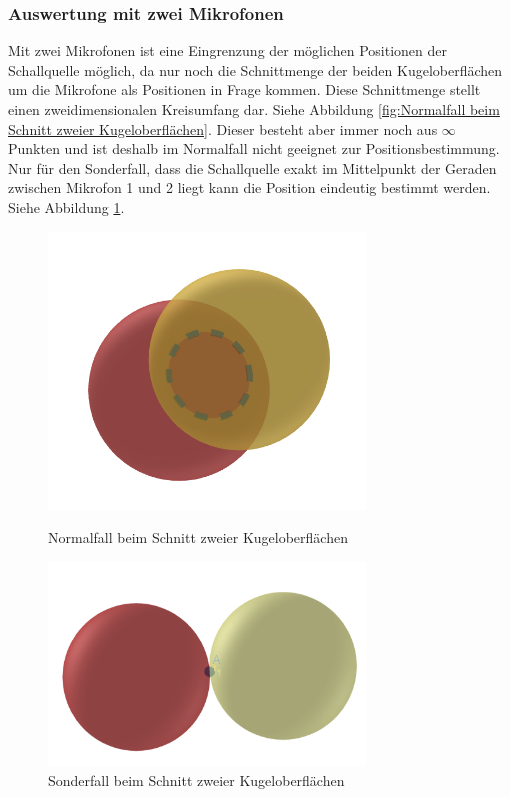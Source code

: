 \subsubsection{Auswertung mit zwei Mikrofonen}
Mit zwei Mikrofonen ist eine Eingrenzung der möglichen Positionen der Schallquelle möglich, da nur noch die Schnittmenge der beiden Kugeloberflächen um die Mikrofone als Positionen in Frage kommen. Diese Schnittmenge stellt einen zweidimensionalen Kreisumfang dar. Siehe Abbildung \ref{fig:Normalfall beim Schnitt zweier Kugeloberflächen}. Dieser besteht aber immer noch aus $\infty$ Punkten und ist deshalb im Normalfall nicht geeignet zur Positionsbestimmung. Nur für den Sonderfall, dass die Schallquelle exakt im Mittelpunkt der Geraden zwischen Mikrofon 1 und 2 liegt kann die Position eindeutig bestimmt werden. Siehe Abbildung \ref{fig:Sonderfall beim Schnitt zweier Kugeloberflächen}.
\begin{figure}[b]
	\centering
	\begin{minipage}[t]{0.45\linewidth}
		\centering
		\includegraphics[width=0.75\textwidth]{Schnitt_2_Kugeln}
		\caption{Normalfall beim Schnitt zweier Kugeloberflächen}\label{fig:Normalfall beim Schnitt zweier Kugeloberflächen}		
	\end{minipage}
	\hfill
	\begin{minipage}[t]{0.45\linewidth}
		\centering
		\includegraphics[width=0.75\textwidth]{2KugelnSonderfall}
		\caption{Sonderfall beim Schnitt zweier Kugeloberflächen}\label{fig:Sonderfall beim Schnitt zweier Kugeloberflächen}
	\end{minipage}
\end{figure}

